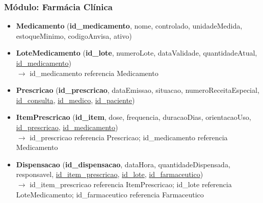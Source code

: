 \subsubsection{Módulo: Farmácia Clínica}
\begin{itemize}[itemsep=10pt]

    \item \textbf{Medicamento} (\textbf{id\_medicamento}, nome, controlado, unidadeMedida, estoqueMinimo, codigoAnvisa, ativo)

    \item \textbf{LoteMedicamento} (\textbf{id\_lote}, numeroLote, dataValidade, quantidadeAtual, \underline{id\_medicamento})
    \\{\small $\rightarrow$ id\_medicamento referencia Medicamento}


    \item \textbf{Prescricao} (\textbf{id\_prescricao}, dataEmissao, situacao, numeroReceitaEspecial, \underline{id\_consulta}, \underline{id\_medico}, \underline{id\_paciente})


    \item \textbf{ItemPrescricao} (\textbf{id\_item}, dose, frequencia, duracaoDias, orientacaoUso, \underline{id\_prescricao}, \underline{id\_medicamento})
    \\{\small $\rightarrow$ id\_prescricao referencia Prescricao; id\_medicamento referencia Medicamento}


    \item \textbf{Dispensacao} (\textbf{id\_dispensacao}, dataHora, quantidadeDispensada, responsavel, \underline{id\_item\_prescricao}, \underline{id\_lote}, \underline{id\_farmaceutico})
    \\{\small $\rightarrow$ id\_item\_prescricao referencia ItemPrescricao; id\_lote referencia LoteMedicamento; id\_farmaceutico referencia Farmaceutico}


\end{itemize}

